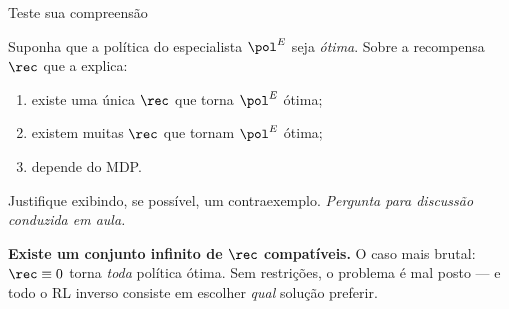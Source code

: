 \documentclass[aspectratio=169, 11pt]{beamer}
\newcommand{\paradiscussao}{\smallskip
  {\footnotesize\color{rlCinza}\itshape Pergunta para discussão conduzida em aula.}}
\newcommand{\polE}{\pol^{E}}                     %
\begin{document}
\begin{frame}{Teste sua compreensão}

  \begin{quizbox}{}
    Suponha que a política do especialista $\polE$ seja \emph{ótima}. Sobre a
    recompensa $\rec$ que a explica:
    \begin{enumerate}\setlength{\itemsep}{0.1ex}
      \item[1.] existe uma única $\rec$ que torna $\polE$ ótima;
      \item[2.] existem muitas $\rec$ que tornam $\polE$ ótima;
      \item[3.] depende do MDP.
    \end{enumerate}
    Justifique exibindo, se possível, um contraexemplo.
    \paradiscussao
  \end{quizbox}

  \pause

  \begin{respbox}
    \textbf{Existe um conjunto infinito de $\rec$ compatíveis.} O caso mais
    brutal: $\rec \equiv 0$ torna \emph{toda} política ótima. Sem restrições, o
    problema é mal posto --- e todo o RL inverso consiste em escolher
    \emph{qual} solução preferir.
  \end{respbox}
\end{frame}
\end{document}
